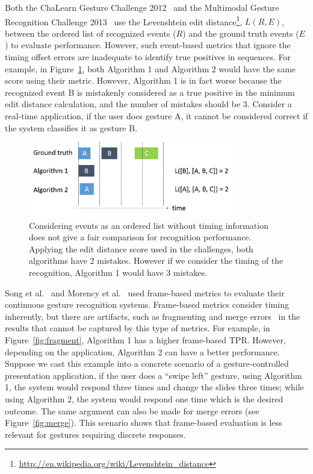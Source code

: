 Both the ChaLearn Gesture Challenge 2012~\cite{guyon13} and the Multimodal
Gesture Recognition Challenge 2013~\cite{escalera2013} use the Levenshtein edit
distance\footnote{\url{http://en.wikipedia.org/wiki/Levenshtein_distance}},
$L(R, E)$, between the ordered list of recognized events ($R$) and the ground
truth events ($E$) to evaluate performance. However, such event-based metrics
that ignore the timing offset errors are inadequate to identify true positives
in sequences. For example, in Figure~\ref{fig:edit-distance}, both Algorithm 1
and Algorithm 2 would have the same score using their metric. However, Algorithm
1 is in fact worse because the recognized event B is mistakenly considered as a
true positive in the minimum edit distance calculation, and the number
of mistakes should be 3.
Consider a real-time application, if the user does gesture A, it cannot be considered correct if the
system classifies it as gesture B.

\begin{figure}[tbh]
\centering
\includegraphics[width=0.8\textwidth]{figures/edit_distance.png}
\caption{Considering events as an ordered list without timing information does
not give a fair comparison for recognition performance. Applying the edit
distance score used in the challenges, both algorithms have 2 mistakes. However if
we consider the timing of the recognition, Algorithm 1 would have 3 mistakes.}
\label{fig:edit-distance}
\end{figure}

Song et al.~\cite{song12} and Morency et al.~\cite{morency07} used frame-based
metrics to evaluate their continuous gesture recognition systems. Frame-based
metrics consider timing inherently, but there are
artifacts, such as fragmenting and merge errors~\cite{ward11} in the results
that cannot be captured by this type of metrics. For example, in
Figure~\ref{fig:fragment}, Algorithm 1 has a higher frame-based TPR. However,
depending on the application, Algorithm 2 can have a better performance. Suppose we cast this example into a concrete scenario of a gesture-controlled presentation application, 
if the user does a ``swipe left'' gesture, using Algorithm 1, the system would
respond three times and change the slides three times; while using Algorithm 2,
the system would respond one time which is the desired outcome. The same
argument can also be made for merge errors (see Figure~\ref{fig:merge}). This
scenario shows that frame-based evaluation is less relevant for gestures
requiring discrete responses.

